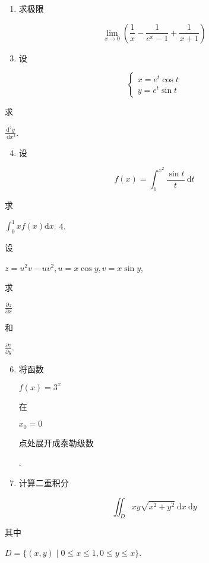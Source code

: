 \documentclass[10pt]{article}
\begin{document}
\begin{enumerate}
  \item \begin{CJK}{UTF8}{mj}求极限\end{CJK}
\end{enumerate}
$$
\lim _{x \rightarrow 0}\left(\frac{1}{x}-\frac{1}{e^{x}-1}+\frac{1}{x+1}\right)
$$

\begin{enumerate}
  \setcounter{enumi}{2}
  \item \begin{CJK}{UTF8}{mj}设\end{CJK}
\end{enumerate}
$$
\left\{\begin{array}{l}
x=e^{t} \cos t \\
y=e^{t} \sin t
\end{array}\right.
$$
\begin{CJK}{UTF8}{mj}求\end{CJK} $\frac{\mathrm{d}^{2} y}{\mathrm{~d} x^{2}}$.

\begin{enumerate}
  \setcounter{enumi}{3}
  \item \begin{CJK}{UTF8}{mj}设\end{CJK}
\end{enumerate}
$$
f(x)=\int_{1}^{x^{2}} \frac{\sin t}{t} \mathrm{~d} t
$$
\begin{CJK}{UTF8}{mj}求\end{CJK} $\int_{0}^{1} x f(x) \mathrm{d} x$. 4. \begin{CJK}{UTF8}{mj}设\end{CJK} $z=u^{2} v-u v^{2}, u=x \cos y, v=x \sin y$, \begin{CJK}{UTF8}{mj}求\end{CJK} $\frac{\partial z}{\partial x}$ \begin{CJK}{UTF8}{mj}和\end{CJK} $\frac{\partial z}{\partial y}$.

\begin{enumerate}
  \setcounter{enumi}{5}
  \item \begin{CJK}{UTF8}{mj}将函数\end{CJK} $f(x)=3^{x}$ \begin{CJK}{UTF8}{mj}在\end{CJK} $x_{0}=0$ \begin{CJK}{UTF8}{mj}点处展开成泰勒级数\end{CJK}.

  \item \begin{CJK}{UTF8}{mj}计算二重积分\end{CJK}

\end{enumerate}
$$
\iint_{D} x y \sqrt{x^{2}+y^{2}} \mathrm{~d} x \mathrm{~d} y
$$
\begin{CJK}{UTF8}{mj}其中\end{CJK} $D=\{(x, y) \mid 0 \leqslant x \leqslant 1,0 \leqslant y \leqslant x\}$.
\end{document}
